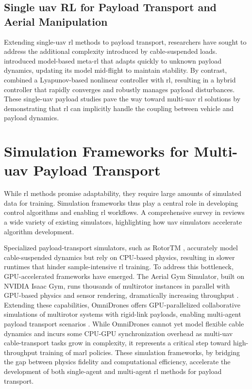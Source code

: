 \subsection{Single \gls{uav} RL for Payload Transport and Aerial Manipulation}
Extending single-\gls{uav} \gls{rl} methods to payload transport, researchers have sought to address the additional complexity introduced by cable-suspended loads. \cite{belkhale_model-based_2021} introduced model-based meta-\gls{rl} that adapts quickly to unknown payload dynamics, updating its model mid-flight to maintain stability. By contrast, \cite{hua_new_2022} combined a Lyapunov-based nonlinear controller with \gls{rl}, resulting in a hybrid controller that rapidly converges and robustly manages payload disturbances. 
These single-\gls{uav} payload studies pave the way toward multi-\gls{uav} \gls{rl} solutions by demonstrating that \gls{rl} can implicitly handle the coupling between vehicle and payload dynamics.

\section{Simulation Frameworks for Multi-\gls{uav} Payload Transport}
While \gls{rl} methods promise adaptability, they require large amounts of simulated data for training. Simulation frameworks thus play a central role in developing control algorithms and enabling \gls{rl} workflows. A comprehensive survey in \cite{Dimmig2023SurveyOS} reviews a wide variety of existing simulators, highlighting how \gls{uav} simulators accelerate algorithm development.

Specialized payload-transport simulators, such as RotorTM \cite{Li2022RotorTMAF}, accurately model cable-suspended dynamics but rely on CPU-based physics, resulting in slower runtimes that hinder sample-intensive \gls{rl} training. To address this bottleneck, GPU-accelerated frameworks have emerged. The Aerial Gym Simulator, built on NVIDIA Isaac Gym, runs thousands of multirotor instances in parallel with GPU-based physics and sensor rendering, dramatically increasing throughput \cite{aerial_gym_simulator}. Extending these capabilities, OmniDrones offers GPU-parallelized collaborative simulations of multirotor systems with rigid-link payloads, enabling multi-agent payload transport scenarios \cite{xu_omnidrones_2024}. While OmniDrones cannot yet model flexible cable dynamics and incurs some CPU-GPU synchronization overhead as multi-\gls{uav} cable-transport tasks grow in complexity, it represents a critical step toward high-throughput training of \gls{marl} policies. These simulation frameworks, by bridging the gap between physics fidelity and computational efficiency, accelerate the development of both single-agent and multi-agent \gls{rl} methods for payload transport.


